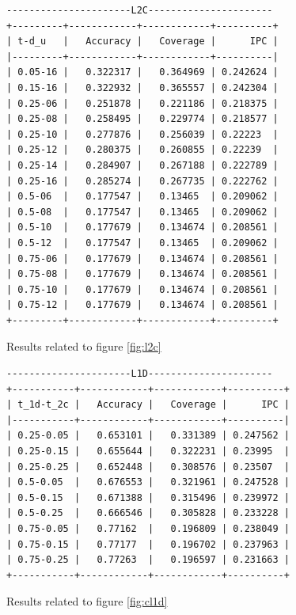 \documentclass[11pt, swedish, openany]{book}
\begin{document}
\begin{figure}[H]
    \centering
    \begin{BVerbatim}
----------------------L2C----------------------
+---------+------------+------------+----------+
| t-d_u   |   Accuracy |   Coverage |      IPC |
|---------+------------+------------+----------|
| 0.05-16 |   0.322317 |   0.364969 | 0.242624 |
| 0.15-16 |   0.322932 |   0.365557 | 0.242304 |
| 0.25-06 |   0.251878 |   0.221186 | 0.218375 |
| 0.25-08 |   0.258495 |   0.229774 | 0.218577 |
| 0.25-10 |   0.277876 |   0.256039 | 0.22223  |
| 0.25-12 |   0.280375 |   0.260855 | 0.22239  |
| 0.25-14 |   0.284907 |   0.267188 | 0.222789 |
| 0.25-16 |   0.285274 |   0.267735 | 0.222762 |
| 0.5-06  |   0.177547 |   0.13465  | 0.209062 |
| 0.5-08  |   0.177547 |   0.13465  | 0.209062 |
| 0.5-10  |   0.177679 |   0.134674 | 0.208561 |
| 0.5-12  |   0.177547 |   0.13465  | 0.209062 |
| 0.75-06 |   0.177679 |   0.134674 | 0.208561 |
| 0.75-08 |   0.177679 |   0.134674 | 0.208561 |
| 0.75-10 |   0.177679 |   0.134674 | 0.208561 |
| 0.75-12 |   0.177679 |   0.134674 | 0.208561 |
+---------+------------+------------+----------+
    \end{BVerbatim}
    \caption{Results related to figure \ref{fig:l2c}}
\end{figure}

\begin{figure}[H]
    \centering
    \begin{BVerbatim}
----------------------L1D----------------------
+-----------+------------+------------+----------+
| t_1d-t_2c |   Accuracy |   Coverage |      IPC |
|-----------+------------+------------+----------|
| 0.25-0.05 |   0.653101 |   0.331389 | 0.247562 |
| 0.25-0.15 |   0.655644 |   0.322231 | 0.23995  |
| 0.25-0.25 |   0.652448 |   0.308576 | 0.23507  |
| 0.5-0.05  |   0.676553 |   0.321961 | 0.247528 |
| 0.5-0.15  |   0.671388 |   0.315496 | 0.239972 |
| 0.5-0.25  |   0.666546 |   0.305828 | 0.233228 |
| 0.75-0.05 |   0.77162  |   0.196809 | 0.238049 |
| 0.75-0.15 |   0.77177  |   0.196702 | 0.237963 |
| 0.75-0.25 |   0.77263  |   0.196597 | 0.231663 |
+-----------+------------+------------+----------+
    \end{BVerbatim}
    \caption{Results related to figure \ref{fig:cl1d}}
\end{figure}
\end{document}
